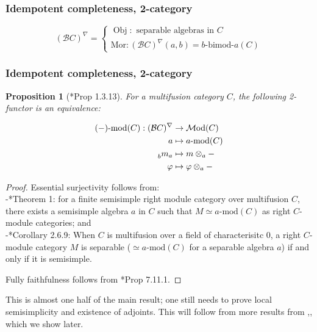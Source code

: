 \documentclass{beamer}
\newcommand{\tnsr}{\otimes}
\newcommand{\vphi}{\varphi}
\DeclareMathOperator{\Obj}{Obj}
\newtheorem{proposition}[theorem]{Proposition}
\newcommand{\cB}{{\mathcal{B}}}
\newcommand{\bimod}[2]{{#1\textrm{-bimod-}#2}}
\newcommand{\amod}[1]{{#1\textrm{-mod}}}
\newcommand{\Mod}{{\mathcal{M}\textrm{od}}}
\newcommand{\ModA}[1]{{\Mod(#1)}}
\begin{document}
\begin{frame}
\frametitle{Idempotent completeness, 2-category}


\[
(\cB C)^\nabla =
\begin{cases}
	\Obj: \text{ separable algebras in } C
	\\
	\text{Mor}: (\cB C)^\nabla (a,b) = \bimod{b}{a}(C)
\end{cases}
\]


\end{frame}

\begin{frame}
\frametitle{Idempotent completeness, 2-category}


\begin{proposition}[\cite{DRfusion}*{Prop 1.3.13}]
\label{p:modC-deloop}
For a multifusion category $C$,
the following 2-functor is an equivalence:

\begin{align*}
\amod{(-)}(C): (\cB C)^\nabla
	& \to
	\ModA{C}
\\
a & \mapsto
	\amod{a}(C)
\\
\prescript{}{b}m_a & \mapsto
	m \tnsr_a -
\\
\vphi & \mapsto
\vphi \tnsr_a -
\end{align*}
\end{proposition}


\begin{proof}
Essential surjectivity follows from:\\
-\cite{Ostrik}*{Theorem 1}: for a finite semisimple right module
category over multifusion $C$, there exists a semisimple algebra
$a$ in $C$ such that $M \simeq \amod{a}(C)$
as right $C$-module categories; and\\
-\cite{DSPSb}*{Corollary 2.6.9}: When $C$ is multifusion over
a field of characterisitc 0,
a right $C$-module category $M$ is separable
($\simeq \amod{a}(C)$ for a separable algebra $a$)
if and only if it is semisimple.

Fully faithfulness follows from \cite{EGNO}*{Prop 7.11.1}.
\end{proof}

This is almost one half of the main result;
one still needs to prove local semisimplicity
and existence of adjoints.
This will follow from more results from \cite{DSPSa},\cite{DSPSb},
which we show later.

\end{frame}
\end{document}
